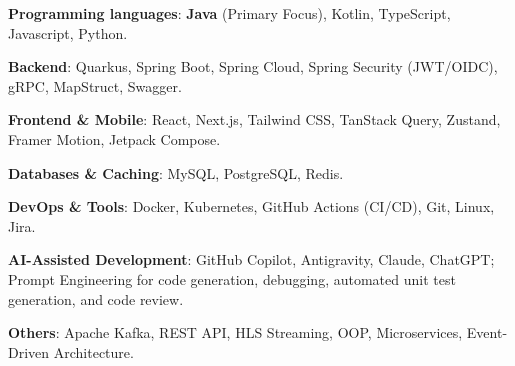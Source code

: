 \begin{cvempty} %
    \begin{cvitems} %
        \item{\textbf{Programming languages}: \textbf{Java} (Primary Focus), Kotlin, TypeScript, Javascript, Python.}
        \item{\textbf{Backend}: Quarkus, Spring Boot, Spring Cloud, Spring Security (JWT/OIDC), gRPC, MapStruct, Swagger.}
        \item{\textbf{Frontend \& Mobile}: React, Next.js, Tailwind CSS, TanStack Query, Zustand, Framer Motion, Jetpack Compose.}
        \item{\textbf{Databases \& Caching}: MySQL, PostgreSQL, Redis.}
        \item{\textbf{DevOps \& Tools}: Docker, Kubernetes, GitHub Actions (CI/CD), Git, Linux, Jira.}
        \item{\textbf{AI-Assisted Development}: GitHub Copilot, Antigravity, Claude, ChatGPT; Prompt Engineering for code generation, debugging, automated unit test generation, and code review.}
        \item{\textbf{Others}: Apache Kafka, REST API, HLS Streaming, OOP, Microservices, Event-Driven Architecture.}
    
    \end{cvitems}
\end{cvempty}
